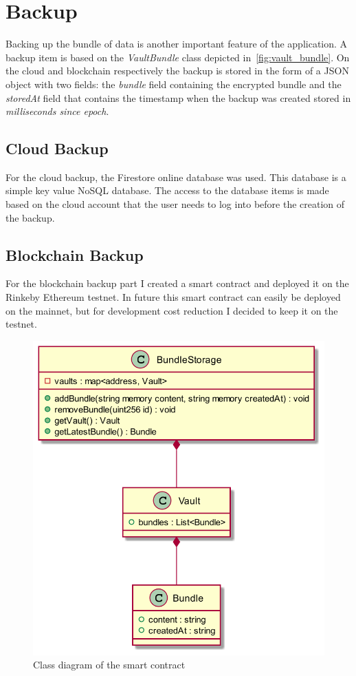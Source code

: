 \documentclass[a4paper,12pt]{report}
\begin{document}
\section{Backup}

Backing up the bundle of data is another important feature of the application.
A backup item is based on the \textit{VaultBundle} class depicted
in~\autoref{fig:vault_bundle}. On the cloud and blockchain respectively the
backup is stored in the form of a JSON object with two fields: the
\textit{bundle} field containing the encrypted bundle and the \textit{storedAt}
field that contains the timestamp when the backup was created stored in
\textit{milliseconds since epoch}.

\subsection{Cloud Backup}

For the cloud backup, the Firestore online database was used. This database is
a simple key value NoSQL database. The access to the database items is made
based on the cloud account that the user needs to log into before the creation
of the backup.

\subsection{Blockchain Backup}

For the blockchain backup part I created a smart contract and deployed it on
the Rinkeby Ethereum testnet. In future this smart contract can easily be
deployed on the mainnet, but for development cost reduction I decided to keep
it on the testnet.

\begin{figure}[H]
    \centering
    \includegraphics[scale=0.4]{diagrams/class/contract.png}
    \caption{Class diagram of the smart contract}\label{fig:contract}
\end{figure}
\end{document}
